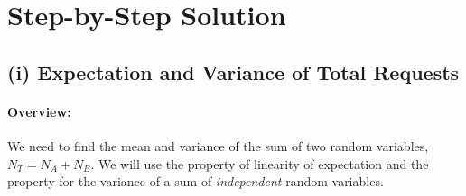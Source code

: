 \documentclass[11pt,a4paper]{article}
\begin{document}
\newpage
\section{Step-by-Step Solution}

\subsection{(i) Expectation and Variance of Total Requests}

\paragraph{Overview:}
We need to find the mean and variance of the sum of two random variables, $N_T = N_A + N_B$. We will use the property of linearity of expectation and the property for the variance of a sum of \textit{independent} random variables.
\end{document}
